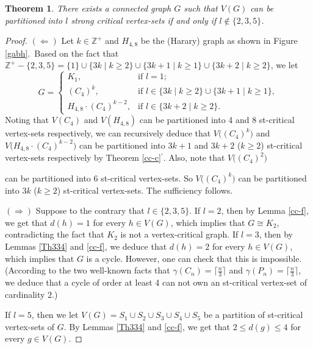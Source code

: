 \documentclass[a4paper,11pt]{article}
\numberwithin{equation}{section}
\newtheorem{thm}{Theorem}[section]
\begin{document}
\begin{thm}\label{main}
There exists a connected graph $G$ such that $V(G)$ can be partitioned into $l$  strong critical vertex-sets if and only if $l\notin\{2,3,5\}$.
\end{thm}
\begin{proof}
$(\Leftarrow)$ Let $k\in \mathbb{Z}^+$ and $H_{4,8}$ be the (Harary) graph as shown in Figure \ref{gabh}.~Based on the fact that $\mathbb{Z}^+-\{2,3,5\}=\{1\}\cup\{3k\mid k\geq2\}\cup\{3k+1\mid k\geq1\}\cup\{3k+2\mid k\geq2\}$, we let
\begin{equation*}
G=
\begin{cases}
K_1, & \mbox{if~$l=1$};\\
(C_4)^{k}, & \mbox{if~$l\in \{3k\mid k\geq2\}\cup\{3k+1\mid k\geq1\}$},\\
H_{4,8} \cdot (C_4)^{k-2}, & \mbox{if~$l\in \{3k+2\mid k\geq2\}$}.
\end{cases}
\end{equation*}
Noting that   $V(C_4)$ and $V(H_{4,8})$ can be partitioned into 4 and 8 st-critical vertex-sets respectively, we can recursively deduce that $V\big((C_4)^{k}\big)$ and $V\big(H_{4,8} \cdot (C_4)^{k-2}\big)$ can be partitioned into $3k+1$ and $3k+2$ ($k\geq2$) st-critical vertex-sets respectively  by Theorem \ref{cc-c}$^{\prime}$. Also, note that $V\big((C_4)^{2}\big)$

\noindent can be partitioned into 6 st-critical vertex-sets. So $V\big((C_4)^{k}\big)$ can be partitioned into $3k$ ($k\geq2$) st-critical vertex-sets. The sufficiency follows.


\smallskip
$(\Rightarrow)$ Suppose to the contrary that $l\in\{2,3,5\}$. If $l=2$, then by Lemma \ref{cc-f}, we get that $d(h)=1$ for every $h\in V(G)$, which implies that $G\cong K_2$, contradicting the fact that $K_2$ is not a vertex-critical graph. If $l=3$, then by Lemmas \ref{Th334} and \ref{cc-f}, we deduce that $d(h)=2$ for every $h\in V(G)$, which implies that $G$ is a cycle. However, one can check that this is impossible. (According to the two well-known facts that $\gamma(C_n)=\lceil\frac{n}{3}\rceil$ and $\gamma(P_n)=\lceil\frac{n}{3}\rceil$, we deduce that a cycle of order at least 4 can not own an st-critical vertex-set of cardinality $2$.)

If $l=5$, then we let $V(G)=S_1\cup S_2\cup S_3\cup S_4\cup S_5$ be a partition of st-critical vertex-sets of $G$. By Lemmas \ref{Th334} and  \ref{cc-f}, we get that $2\leq d(g)\leq 4$ for every $g\in V(G)$.




\end{proof}
\end{document}
